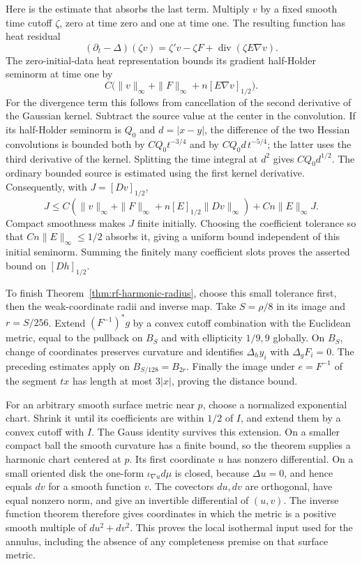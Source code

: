 Here is the estimate that absorbs the last term.  Multiply $v$
by a fixed smooth time cutoff $\zeta$, zero at time zero and
one at time one.  The resulting function has heat residual
\[
 (\partial_t-\Delta)(\zeta v)
    =\zeta'v-\zeta F+
                        \operatorname{div}(\zeta E\nabla v).
\]
The zero-initial-data heat representation bounds its gradient
half-Holder seminorm at time one by
\[
 C\bigl(\|v\|_\infty+\|F\|_\infty
                    +n[E\nabla v]_{1/2}\bigr).
\]
For the divergence term this follows from cancellation of the
second derivative of the Gaussian kernel.  Subtract the source
value at the center in the convolution.  If its half-Holder
seminorm is $Q_0$ and $d=|x-y|$, the difference of the two
Hessian convolutions is bounded both by
$C Q_0t^{-3/4}$ and by $C Q_0d\,t^{-5/4}$; the latter uses
the third derivative of the kernel.  Splitting the time
integral at $d^2$ gives $C Q_0d^{1/2}$.  The ordinary bounded
source is estimated using the first kernel derivative.
Consequently, with $J=[Dv]_{1/2}$,
\[
 J\leq C(\|v\|_\infty+\|F\|_\infty
                       +n[E]_{1/2}\|Dv\|_\infty)
                           +Cn\|E\|_\infty J.
\]
Compact smoothness makes $J$ finite initially.  Choosing the
coefficient tolerance so that $Cn\|E\|_\infty\leq1/2$
absorbs it, giving a uniform bound independent of this initial
seminorm.  Summing the finitely many coefficient slots proves
the asserted bound on $[Dh]_{1/2}$.

To finish Theorem~\ref{thm:rf-harmonic-radius}, choose this small
tolerance first, then the weak-coordinate radii and inverse map.
Take $S=\rho/8$ in its image and $r=S/256$.
Extend $(F^{-1})^*g$ by a convex cutoff combination with the
Euclidean metric, equal to the pullback on $B_S$ and with
ellipticity $1/9,9$ globally.  On $B_S$, change of coordinates
preserves curvature and identifies $\Delta_h y_i$ with
$\Delta_gF_i=0$.  The preceding estimates apply on $B_{S/128}
=B_{2r}$.  Finally the image under $e=F^{-1}$ of the segment
$tx$ has length at most $3|x|$, proving the distance bound.

For an arbitrary smooth surface metric near $p$, choose a
normalized exponential chart.  Shrink it until its coefficients
are within $1/2$ of $I$, and extend them by a convex cutoff
with $I$.  The Gauss identity survives this extension.  On a
smaller compact ball the smooth curvature has a finite bound,
so the theorem supplies a harmonic chart centered at $p$.
Its first coordinate $u$ has nonzero differential.  On a small
oriented disk the one-form $\iota_{\nabla u}d\mu$ is closed,
because $\Delta u=0$, and hence equals $dv$ for a smooth
function $v$.  The covectors $du,dv$ are orthogonal, have equal
nonzero norm, and give an invertible differential of $(u,v)$.
The inverse function theorem therefore gives coordinates in
which the metric is a positive smooth multiple of $du^2+dv^2$.
This proves the local isothermal input used for the annulus,
including the absence of any completeness premise on that
surface metric.

